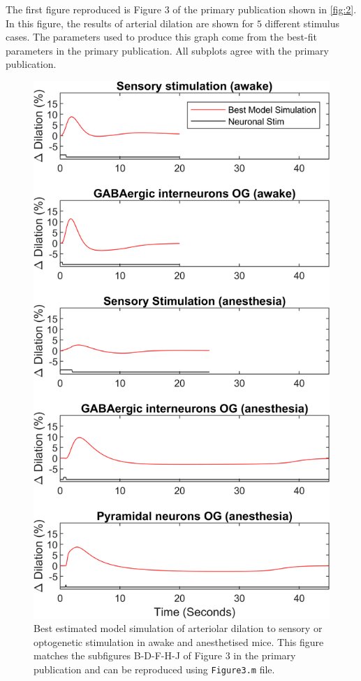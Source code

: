 \documentclass[fleqn,10pt]{physiome}
\begin{document}
The first figure reproduced is Figure $3$ of the primary publication shown in \autoref{fig:2}. In this figure, the results of arterial dilation are shown for $5$ different stimulus cases. The parameters used to produce this graph come from the best-fit parameters in the primary publication. All subplots agree with the primary publication. 

\begin{figure}[htbp]
    \centering
    \includegraphics[scale=0.7,keepaspectratio]{Figure3.png}
    \caption{Best estimated model simulation of arteriolar dilation to sensory or optogenetic stimulation in awake and anesthetised mice. This figure matches the subfigures B-D-F-H-J of Figure $3$ in the primary publication and can be reproduced using \texttt{Figure3.m} file.}
    \label{fig:2}
\end{figure}
\end{document}
